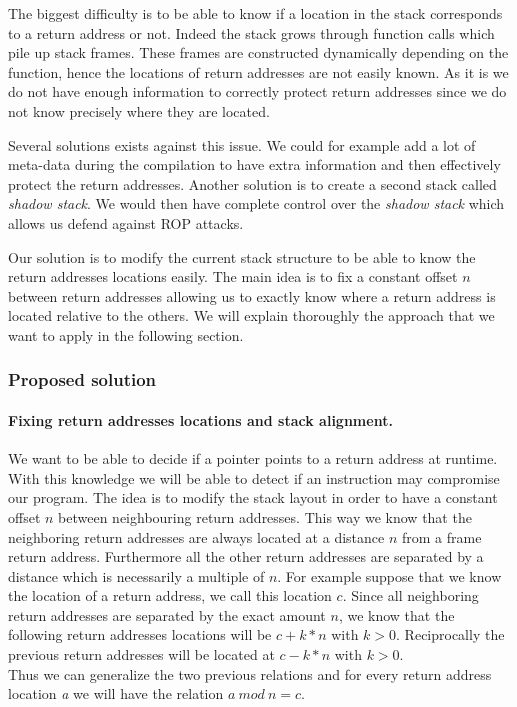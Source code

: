 \documentclass[11pt]{sdm}
\begin{document}
The biggest difficulty is to be able to know if a location in the stack corresponds to a return address or not. Indeed the stack grows through function calls which pile up stack frames. 
These frames are constructed dynamically depending on the function, hence the locations of return addresses are not easily known.
As it is we do not have enough information to correctly protect return addresses since we do not know precisely where they are located.

Several solutions exists against this issue. We could for example add a lot of meta-data during the compilation to have extra information and then effectively protect the return addresses. Another solution is to create a second stack called \textit{shadow stack}. We would then have complete control over the \textit{shadow stack} which allows us defend against ROP attacks.

Our solution is to modify the current stack structure to be able to know the return addresses locations easily. The main idea is to fix a constant offset $n$ between return addresses allowing us to exactly know where a return address is located relative to the others. We will explain thoroughly the approach that we want to apply in the following section.

\subsubsection{Proposed solution}

\paragraph{Fixing return addresses locations and stack alignment.}
\label{par:Fixing return addresses locations}

We want to be able to decide if a pointer points to a return address at runtime. With this knowledge we will be able to detect if an instruction may compromise our program.
The idea is to modify the stack layout in order to have a constant offset $n$ between neighbouring return addresses. This way we know that the neighboring return addresses are always located at a distance $n$ from a frame return address. Furthermore all the other return addresses are separated by a distance which is necessarily a multiple of $n$.
For example suppose that we know the location of a return address, we call this location $c$.
Since all neighboring return addresses are separated by the exact amount $n$, we know that the following return addresses locations will be $c+k*n$ with $k>0$. Reciprocally the previous return addresses will be located at $c-k*n$ with $k>0$.\\
Thus we can generalize the two previous relations and for every return address location \textit{a} we will have the relation $a~mod~n = c$.
\end{document}
